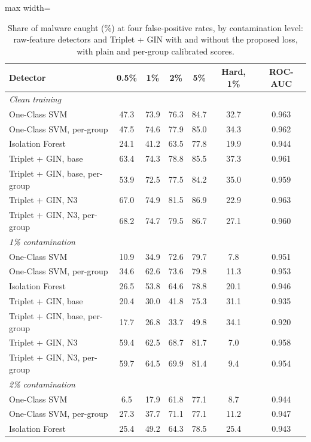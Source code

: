 \begin{table}[htbp]
\centering
\footnotesize
\caption{Share of malware caught (\%) at four false-positive rates, by contamination level: raw-feature detectors and Triplet + GIN with and without the proposed loss, with plain and per-group calibrated scores.}
\label{tab:operating-grid}
\begin{adjustbox}{max width=\linewidth}
\begin{tabular}{lcccccc}
\toprule
Detector & 0.5\% & 1\% & 2\% & 5\% & Hard, 1\% & ROC-AUC \\
\midrule
\multicolumn{7}{l}{\textit{Clean training}} \\
One-Class SVM & 47.3 & 73.9 & 76.3 & 84.7 & 32.7 & 0.963 \\
One-Class SVM, per-group & 47.5 & 74.6 & 77.9 & 85.0 & 34.3 & 0.962 \\
Isolation Forest & 24.1 & 41.2 & 63.5 & 77.8 & 19.9 & 0.944 \\
Triplet + GIN, base & 63.4 & 74.3 & 78.8 & 85.5 & 37.3 & 0.961 \\
Triplet + GIN, base, per-group & 53.9 & 72.5 & 77.5 & 84.2 & 35.0 & 0.959 \\
Triplet + GIN, N3 & 67.0 & 74.9 & 81.5 & 86.9 & 22.9 & 0.963 \\
Triplet + GIN, N3, per-group & 68.2 & 74.7 & 79.5 & 86.7 & 27.1 & 0.960 \\
\midrule
\multicolumn{7}{l}{\textit{1\% contamination}} \\
One-Class SVM & 10.9 & 34.9 & 72.6 & 79.7 & 7.8 & 0.951 \\
One-Class SVM, per-group & 34.6 & 62.6 & 73.6 & 79.8 & 11.3 & 0.953 \\
Isolation Forest & 26.5 & 53.8 & 64.6 & 78.8 & 20.1 & 0.946 \\
Triplet + GIN, base & 20.4 & 30.0 & 41.8 & 75.3 & 31.1 & 0.935 \\
Triplet + GIN, base, per-group & 17.7 & 26.8 & 33.7 & 49.8 & 34.1 & 0.920 \\
Triplet + GIN, N3 & 59.4 & 62.5 & 68.7 & 81.7 & 7.0 & 0.958 \\
Triplet + GIN, N3, per-group & 59.7 & 64.5 & 69.9 & 81.4 & 9.4 & 0.954 \\
\midrule
\multicolumn{7}{l}{\textit{2\% contamination}} \\
One-Class SVM & 6.5 & 17.9 & 61.8 & 77.1 & 8.7 & 0.944 \\
One-Class SVM, per-group & 27.3 & 37.7 & 71.1 & 77.1 & 11.2 & 0.947 \\
Isolation Forest & 25.4 & 49.2 & 64.3 & 78.5 & 25.4 & 0.943 \\

\end{tabular}
\end{adjustbox}
\end{table}
